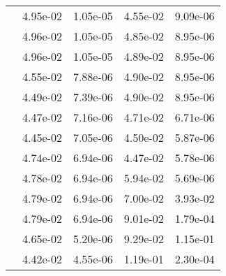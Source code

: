 \begin{table}
\begin{tabular}{c|cc|cc|}
\multicolumn{1}{|c|}{} & \multicolumn{1}{|c|}{  4.95e-02} & \multicolumn{1}{|c|}{  1.05e-05} & \multicolumn{1}{|c|}{  4.55e-02} & \multicolumn{1}{|c|}{  9.09e-06} \\ 
\multicolumn{1}{|c|}{} & \multicolumn{1}{|c|}{  4.96e-02} & \multicolumn{1}{|c|}{  1.05e-05} & \multicolumn{1}{|c|}{  4.85e-02} & \multicolumn{1}{|c|}{  8.95e-06} \\ 
\multicolumn{1}{|c|}{} & \multicolumn{1}{|c|}{  4.96e-02} & \multicolumn{1}{|c|}{  1.05e-05} & \multicolumn{1}{|c|}{  4.89e-02} & \multicolumn{1}{|c|}{  8.95e-06} \\ 
\multicolumn{1}{|c|}{} & \multicolumn{1}{|c|}{  4.55e-02} & \multicolumn{1}{|c|}{  7.88e-06} & \multicolumn{1}{|c|}{  4.90e-02} & \multicolumn{1}{|c|}{  8.95e-06} \\ 
\multicolumn{1}{|c|}{} & \multicolumn{1}{|c|}{  4.49e-02} & \multicolumn{1}{|c|}{  7.39e-06} & \multicolumn{1}{|c|}{  4.90e-02} & \multicolumn{1}{|c|}{  8.95e-06} \\ 
\multicolumn{1}{|c|}{} & \multicolumn{1}{|c|}{  4.47e-02} & \multicolumn{1}{|c|}{  7.16e-06} & \multicolumn{1}{|c|}{  4.71e-02} & \multicolumn{1}{|c|}{  6.71e-06} \\ 
\multicolumn{1}{|c|}{} & \multicolumn{1}{|c|}{  4.45e-02} & \multicolumn{1}{|c|}{  7.05e-06} & \multicolumn{1}{|c|}{  4.50e-02} & \multicolumn{1}{|c|}{  5.87e-06} \\ 
\multicolumn{1}{|c|}{} & \multicolumn{1}{|c|}{  4.74e-02} & \multicolumn{1}{|c|}{  6.94e-06} & \multicolumn{1}{|c|}{  4.47e-02} & \multicolumn{1}{|c|}{  5.78e-06} \\ 
\multicolumn{1}{|c|}{} & \multicolumn{1}{|c|}{  4.78e-02} & \multicolumn{1}{|c|}{  6.94e-06} & \multicolumn{1}{|c|}{  5.94e-02} & \multicolumn{1}{|c|}{  5.69e-06} \\ 
\multicolumn{1}{|c|}{} & \multicolumn{1}{|c|}{  4.79e-02} & \multicolumn{1}{|c|}{  6.94e-06} & \multicolumn{1}{|c|}{  7.00e-02} & \multicolumn{1}{|c|}{  3.93e-02} \\ 
\multicolumn{1}{|c|}{} & \multicolumn{1}{|c|}{  4.79e-02} & \multicolumn{1}{|c|}{  6.94e-06} & \multicolumn{1}{|c|}{  9.01e-02} & \multicolumn{1}{|c|}{  1.79e-04} \\ 
\multicolumn{1}{|c|}{} & \multicolumn{1}{|c|}{  4.65e-02} & \multicolumn{1}{|c|}{  5.20e-06} & \multicolumn{1}{|c|}{  9.29e-02} & \multicolumn{1}{|c|}{  1.15e-01} \\ 
\multicolumn{1}{|c|}{} & \multicolumn{1}{|c|}{  4.42e-02} & \multicolumn{1}{|c|}{  4.55e-06} & \multicolumn{1}{|c|}{  1.19e-01} & \multicolumn{1}{|c|}{  2.30e-04} \\ 

\end{tabular}
\end{table}
